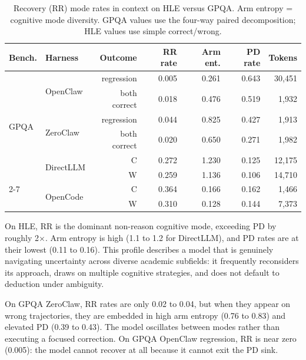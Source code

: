 \begin{table}[t]
\centering
\small
\caption{%
  Recovery (RR) mode rates in context on HLE versus GPQA.
  Arm entropy = cognitive mode diversity.
  GPQA values use the four-way paired decomposition; HLE values use simple
  correct/wrong.
}
\label{tab:hle-rr-context}
\setlength{\tabcolsep}{3pt}
\begin{tabular}{llrrrrr}
\toprule
Bench. & Harness & Outcome & RR rate & Arm ent. & PD rate & Tokens \\
\midrule
\multirow{6}{*}{GPQA}
& \multirow{2}{*}{OpenClaw}
  & regression & 0.005 & 0.261 & 0.643 & 30{,}451 \\
& & both correct & 0.018 & 0.476 & 0.519 &  1{,}932 \\
\midrule
& \multirow{2}{*}{ZeroClaw}
  & regression & 0.044 & 0.825 & 0.427 &  1{,}913 \\
& & both correct & 0.020 & 0.650 & 0.271 &  1{,}982 \\
\midrule
\multirow{4}{*}{HLE}
& \multirow{2}{*}{DirectLLM}
  & C & 0.272 & 1.230 & 0.125 & 12{,}175 \\
& & W & 0.259 & 1.136 & 0.106 & 14{,}710 \\
\cmidrule{2-7}
& \multirow{2}{*}{OpenCode}
  & C & 0.364 & 0.166 & 0.162 &  1{,}466 \\
& & W & 0.310 & 0.128 & 0.144 &  7{,}373 \\
\bottomrule
\end{tabular}
\end{table}


On HLE, RR is the dominant non-reason cognitive mode, exceeding PD by roughly
2$\times$.
Arm entropy is high (1.1 to 1.2 for DirectLLM), and PD rates are at their
lowest (0.11 to 0.16).
This profile describes a model that is genuinely navigating uncertainty across
diverse academic subfields: it frequently reconsiders its approach, draws on
multiple cognitive strategies, and does not default to deduction under ambiguity.

On GPQA ZeroClaw, RR rates are only 0.02 to 0.04, but when they appear on wrong
trajectories, they are embedded in high arm entropy (0.76 to 0.83) and elevated
PD (0.39 to 0.43).
The model oscillates between modes rather than executing a focused correction.
On GPQA OpenClaw regression, RR is near zero (0.005): the model cannot recover
at all because it cannot exit the PD sink.

